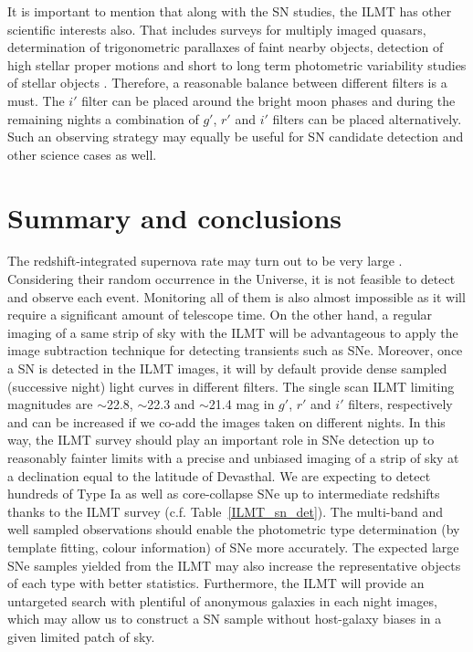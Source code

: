 \documentclass[useAMS,usenatbib]{mnras}
\begin{document}
 
It is important to mention that along with the SN studies, the ILMT has other scientific interests also.
That includes surveys for multiply imaged quasars, determination of trigonometric parallaxes of faint 
nearby objects, detection of high stellar proper motions and short to long term photometric variability 
studies of stellar objects \citep[][]{2006SPIE.6267E...4S,Jean_bina}. Therefore, a reasonable 
balance between different filters is a must. The $i'$ filter can be placed around the bright moon 
phases and during the remaining nights a combination of $g'$, $r'$ and $i'$ filters can be placed
alternatively. Such an observing strategy may equally be useful for SN candidate detection and other 
science cases as well.


\section{Summary and conclusions}\label{concl}

The redshift-integrated supernova rate may turn out to be very large
\citep[$\simeq$5 -- 15 events/sec,][]{1998MNRAS.297L..17M}. Considering their random occurrence 
in the Universe, it is not feasible to detect and observe each event. Monitoring all of them is 
also almost impossible as it will require a significant amount of telescope time. 
On the other hand, a regular imaging of a same strip of sky with the ILMT will be 
advantageous to apply the image subtraction technique for detecting transients such as 
SNe. Moreover, once a SN is detected in the ILMT images, it will by default provide dense sampled 
(successive night) light curves in different filters.
The single scan ILMT limiting magnitudes are $\sim$22.8, $\sim$22.3 and $\sim$21.4 mag in $g'$, $r'$ 
and $i'$ filters, respectively and can be increased if we co-add the images taken on different nights.
In this way, the ILMT survey should play an important role in SNe detection up to reasonably 
fainter limits with a precise and unbiased imaging of a strip of sky at a declination equal 
to the latitude of Devasthal. 
We are expecting to detect hundreds of Type Ia as well as core-collapse SNe up to intermediate 
redshifts thanks to the ILMT survey (c.f. Table~\ref{ILMT_sn_det}).
%
The multi-band and well sampled observations should enable the photometric type determination 
(by template fitting, colour information) of SNe more accurately. The expected large SNe samples 
yielded from the ILMT may also increase the representative objects of each type with better 
statistics. Furthermore, the ILMT will provide an untargeted search with plentiful of anonymous 
galaxies in each night images, which may allow us to construct a SN sample without host-galaxy 
biases in a given limited patch of sky.
\end{document}
